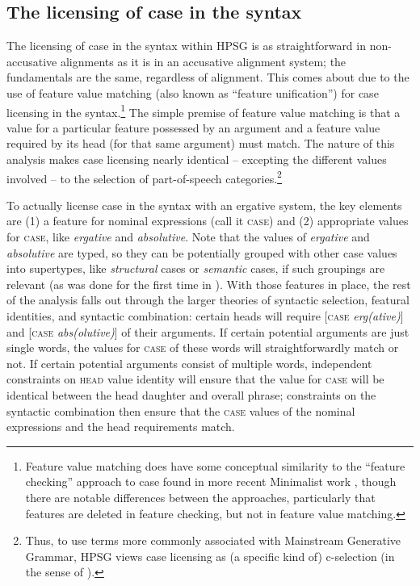 \documentclass[output=paper
	        ,collection
	        ,collectionchapter
 	        ,biblatex
                ,babelshorthands
                ,newtxmath
                ,draftmode
                ,colorlinks, citecolor=brown
]{langscibook}
\begin{document}
\subsection{The licensing of case in the syntax}

The licensing of case in the syntax within HPSG is as straightforward in non-accusative alignments as it is in an accusative alignment system; the fundamentals are the same, regardless of alignment. This comes about due to the use of feature value matching (also known as ``feature unification'') for case licensing in the syntax.\footnote{Feature value matching does have some conceptual similarity to the ``feature checking'' approach to case found in more recent Minimalist work \citep{Chomsky91a-u,Chomsky93b-u,adger2000,Adger2010a,framgut06,pestor07}, though there are notable differences between the approaches, particularly that features are deleted in feature checking, but not in feature value matching.} The simple premise of feature value matching is that a value for a particular feature possessed by an argument and a feature value required by its head (for that same argument) must match. The nature of this analysis makes case licensing nearly identical -- excepting the different values involved -- to the selection of part-of-speech categories.\footnote{Thus, to use terms more commonly associated with Mainstream Generative Grammar, HPSG views case licensing as (a specific kind of) c-selection (in the sense of \citealt{Grimshaw79a-u}).}    

To actually license case in the syntax with an ergative system, the key elements are (1) a feature for nominal expressions (call it \textsc{case}) and (2) appropriate values for \textsc{case}, like \textit{ergative} and \textit{absolutive}. Note that the values of \textit{ergative} and \textit{absolutive} are typed, so they can be potentially grouped with other case values into supertypes, like \textit{structural} cases or \textit{semantic} cases, if such groupings are relevant (as was done for the first time in \citealt{HM94a}). With those features in place, the rest of the analysis falls out through the larger theories of syntactic selection, featural identities, and syntactic combination: certain heads will require [\textsc{case} \textit{erg(ative)}] and [\textsc{case} \textit{abs(olutive)}] of their arguments. If certain potential arguments are just single words, the values for \textsc{case} of these words will straightforwardly match or not. If certain potential arguments consist of multiple words, independent constraints on \textsc{head} value identity will ensure that the value for \textsc{case} will be identical between the head daughter and overall phrase; constraints on the syntactic combination then ensure that the \textsc{case} values of the nominal expressions and the head requirements match. 
\end{document}
